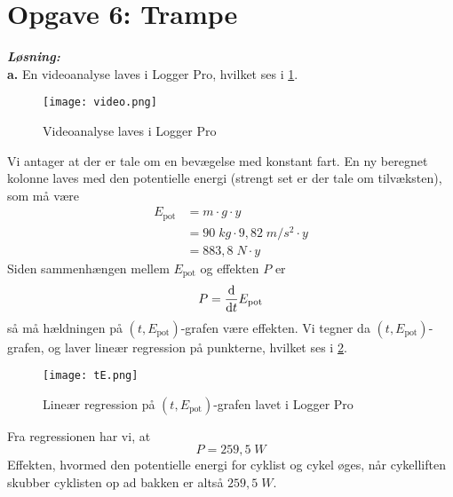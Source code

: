 \documentclass{report}
\newcommand{\sol}{\setlength{\parindent}{0cm}\textbf{\textit{Løsning:}}\setlength{\parindent}{1cm}}
\begin{document}
\section*{Opgave 6: Trampe}
\sol \\
\textbf{a.}
En videoanalyse laves i Logger Pro, hvilket ses i \cref{fig:video}.
\begin{figure}[H]
\begin{center}
  \texttt{[image: video.png]}
\end{center}
\caption{Videoanalyse laves i Logger Pro}
\label{fig:video}
\end{figure}
Vi antager at der er tale om en bevægelse med konstant fart.
En ny beregnet kolonne laves med den potentielle energi (strengt set er der tale om tilvæksten), som må være
\begin{equation*}
\begin{split}
  E _{\text{pot} }&=m \cdot g \cdot y \\
  &=90 \;\unit{kg} \cdot 9,82 \;\unit{m/s^2} \cdot y \\
  &=883,8 \;\unit{N} \cdot y
\end{split}
\end{equation*}
Siden sammenhængen mellem $E _{\text{pot} }$ og effekten $P$ er 
\[
P=\dv{t} E _{\text{pot} }
\] 
så må hældningen på $(t,E _{\text{pot} })$-grafen være effekten.
Vi tegner da $(t,E _{\text{pot} })$-grafen, og laver lineær regression på punkterne, hvilket ses i \cref{fig:tE}.
\begin{figure}[H]
\begin{center}
  \texttt{[image: tE.png]}
\end{center}
  \caption{Lineær regression på $(t,E _{\text{pot} })$-grafen lavet i Logger Pro}
\label{fig:tE}
\end{figure}
Fra regressionen har vi, at
\[
P=259,5 \;\unit{W} 
\] 
Effekten, hvormed den potentielle energi for cyklist og cykel øges, når cykelliften skubber cyklisten op ad bakken er altså $259,5 \;\unit{W} $.
\end{document}
